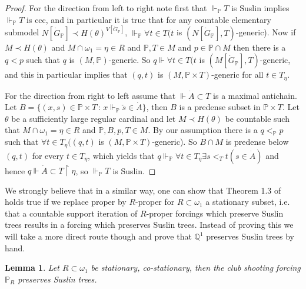 \documentclass[a4paper,12pt]{article}
\newtheorem{lemma}[theorem]{Lemma}
\newcommand{\forceP}{\mathbb{P}}
\newcommand{\forceQ}{\mathbb{Q}}
\begin{document}
\begin{proof}
For the direction from left to right note first that $\Vdash_{\forceP} T$ is Suslin implies $\Vdash_{\forceP} T$ is ccc, and in particular it is true that for any countable elementary submodel $N[\dot{G}_{\forceP}] \prec H(\theta)^{V[\dot{G}_{\forceP}]}$,  $\Vdash_{\forceP} \forall t \in T (t$ is $(N[\dot{G}_{\forceP}],T)$-generic). Now if $M \prec H(\theta)$ and $M \cap \omega_1 = \eta \in R$ and $\forceP,T \in M$ and $p \in \forceP \cap M$ then there is a $q<p$ such that $q$ is $(M,\forceP)$-generic. So $q \Vdash \forall t \in T (t$ is $(M[\dot{G}_{\forceP}], T)$-generic, and this in particular implies that $(q,t)$ is $(M, \forceP \times T)$-generic for all $t \in T_{\eta}$. 

For the direction from right to left assume that $\Vdash \dot{A} \subset T$ is a maximal antichain. Let $B=\{(x,s) \in \forceP \times T \, : \, x \Vdash_{\forceP} \check{s} \in \dot{A} \}$, then $B$ is a predense subset in $\forceP \times T$. Let $\theta$ be a sufficiently large regular cardinal and let $M \prec H(\theta)$ be countable such that $M \cap \omega_1=\eta \in R$ and $\forceP, B,p,T \in M$. By our assumption there is a $q <_{\forceP} p$  such that $\forall t \in T_{\eta} ((q,t)$ is $(M, \forceP \times T)$-generic). So $B \cap M$ is predense below $(q,t)$ for every $t \in T_{\eta}$, which yields that $q \Vdash_{\forceP} \forall t \in T_{\eta} \exists s<_{T} t(s \in \dot{A})$ and hence $q \Vdash \dot{A} \subset T \upharpoonright \eta$, so $\Vdash_{\forceP} T$ is Suslin.
\end{proof}
We strongly believe that in a similar way, one can show that Theorem 1.3 of \cite{Miyamoto2} holds true if we replace proper by $R$-proper for $R \subset \omega_1$ a stationary subset, i.e. that a countable support iteration of $R$-proper forcings which preserve Suslin trees results in a forcing which preserves Suslin trees. Instead of proving this we will take a more direct route though and prove that $\forceQ^1$ preserves Suslin trees by hand.

\begin{lemma}\label{omegadistributive}
Let $R \subset \omega_1$ be stationary, co-stationary, then the club shooting forcing $\forceP_R$ preserves Suslin trees.
\end{lemma}
\end{document}
